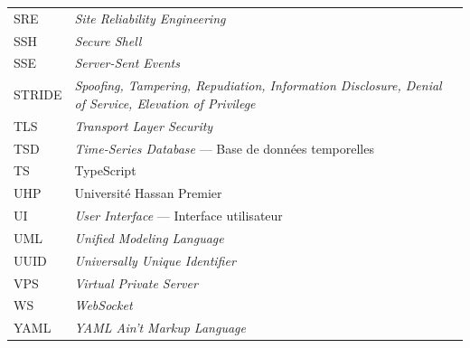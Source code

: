 \begin{longtable}{@{}lp{11cm}@{}}
SRE   & \textit{Site Reliability Engineering} \\
SSH   & \textit{Secure Shell} \\
SSE   & \textit{Server-Sent Events} \\
STRIDE & \textit{Spoofing, Tampering, Repudiation, Information Disclosure, Denial of Service, Elevation of Privilege} \\
TLS   & \textit{Transport Layer Security} \\
TSD   & \textit{Time-Series Database} — Base de données temporelles \\
TS    & TypeScript \\
UHP   & Université Hassan Premier \\
UI    & \textit{User Interface} — Interface utilisateur \\
UML   & \textit{Unified Modeling Language} \\
UUID  & \textit{Universally Unique Identifier} \\
VPS   & \textit{Virtual Private Server} \\
WS    & \textit{WebSocket} \\
YAML  & \textit{YAML Ain't Markup Language} \\
\end{longtable}

